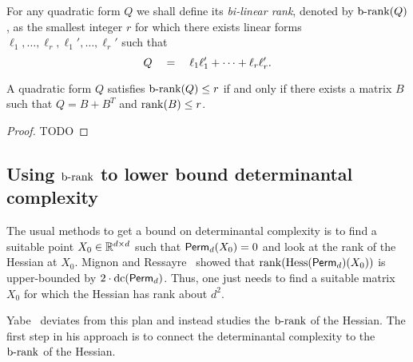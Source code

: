 \begin{definition} For any quadratic form $Q$ we shall define its \emph{bi-linear rank}, denoted by $\text{b-rank}(Q)$, as the smallest integer $r$ for which there exists linear forms $\ell_1,\ldots, \ell_r, \ell_1',\ldots,  \ell_r'$ such that 
\[
Q \quad = \quad \ell_1 \ell_1' + \cdots + \ell_r \ell_r'. \qedhere
\]
\end{definition}

\begin{observation}\label{obs:brank-rank}
A quadratic form $Q$ satisfies $\text{b-rank}(Q) \leq r$ if and only if there exists a matrix $B$ such that $Q = B + B^T$ and $\mathrm{rank}(B) \leq r$. 
\end{observation}
\begin{proof}
TODO
\end{proof}

\subsection{Using $\text{b-rank}$ to lower bound determinantal complexity}

The usual methods to get a bound on determinantal complexity is to find a suitable point $X_0 \in \mathbb{R}^{d\times d}$ such that $\mathsf{Perm}_d(X_0) = 0$ and look at the rank of the Hessian at $X_0$. Mignon and Ressayre~\cite{mr04} showed that $\mathrm{rank}(\mathrm{Hess}(\mathsf{Perm}_d)(X_0))$ is upper-bounded by $2\cdot \mathrm{dc}(\mathsf{Perm}_d)$. Thus, one just needs to find a suitable matrix $X_0$ for which the Hessian has rank about $d^2$. 

Yabe~\cite{Yabe15} deviates from this plan and instead studies the $\text{b-rank}$ of the Hessian. The first step in his approach is to connect the determinantal complexity to the $\text{b-rank}$ of the Hessian. 


